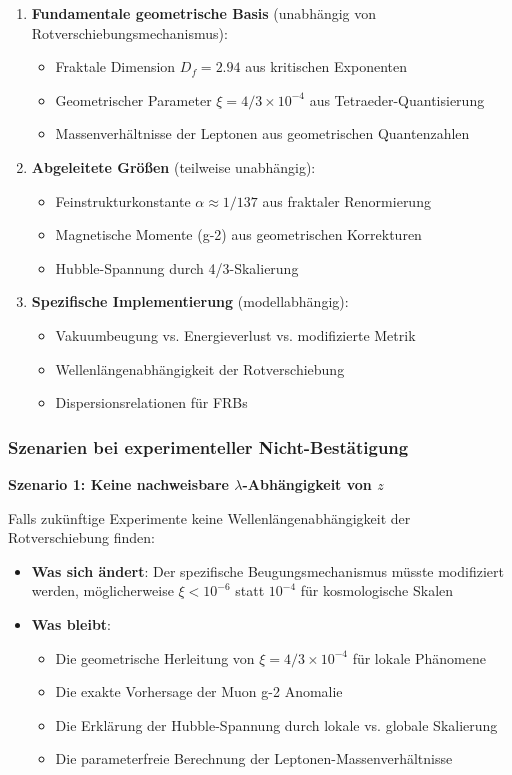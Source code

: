 \documentclass[12pt,a4paper]{article}
\theoremstyle{definition}
\begin{document}
\begin{enumerate}
	\item \textbf{Fundamentale geometrische Basis} (unabhängig von Rotverschiebungsmechanismus):
	\begin{itemize}
		\item Fraktale Dimension \(D_f = 2.94\) aus kritischen Exponenten
		\item Geometrischer Parameter \(\xi = 4/3 \times 10^{-4}\) aus Tetraeder-Quantisierung
		\item Massenverhältnisse der Leptonen aus geometrischen Quantenzahlen
	\end{itemize}
	
	\item \textbf{Abgeleitete Größen} (teilweise unabhängig):
	\begin{itemize}
		\item Feinstrukturkonstante \(\alpha \approx 1/137\) aus fraktaler Renormierung
		\item Magnetische Momente (g-2) aus geometrischen Korrekturen
		\item Hubble-Spannung durch 4/3-Skalierung
	\end{itemize}
	
	\item \textbf{Spezifische Implementierung} (modellabhängig):
	\begin{itemize}
		\item Vakuumbeugung vs. Energieverlust vs. modifizierte Metrik
		\item Wellenlängenabhängigkeit der Rotverschiebung
		\item Dispersionsrelationen für FRBs
	\end{itemize}
\end{enumerate}

\subsubsection{Szenarien bei experimenteller Nicht-Bestätigung}

\textbf{Szenario 1: Keine nachweisbare \(\lambda\)-Abhängigkeit von \(z\)}

Falls zukünftige Experimente keine Wellenlängenabhängigkeit der Rotverschiebung finden:
\begin{itemize}
	\item \textbf{Was sich ändert}: Der spezifische Beugungsmechanismus müsste modifiziert werden, möglicherweise \(\xi < 10^{-6}\) statt \(10^{-4}\) für kosmologische Skalen
	\item \textbf{Was bleibt}: 
	\begin{itemize}
		\item Die geometrische Herleitung von \(\xi = 4/3 \times 10^{-4}\) für lokale Phänomene
		\item Die exakte Vorhersage der Muon g-2 Anomalie
		\item Die Erklärung der Hubble-Spannung durch lokale vs. globale Skalierung
		\item Die parameterfreie Berechnung der Leptonen-Massenverhältnisse
	\end{itemize}
\end{itemize}
\end{document}

